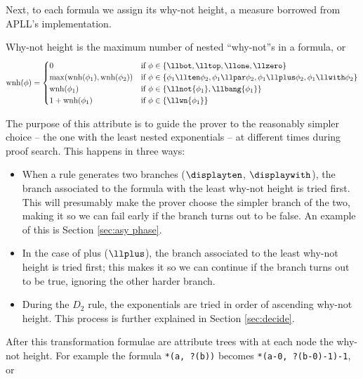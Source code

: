 Next, to each formula we assign its why-not height, a measure borrowed from APLL's implementation.
\begin{define}
	\label{def:why-not height}
	Why-not height is the maximum number of nested ``why-not''s in a formula, or
	$$ \mathrm{wnh}(\phi) = 
	\begin{cases}	
		0 & \text{if }\phi \in \{\llbot, \lltop, \llone, \llzero\} \\
		\max(\mathrm{wnh}(\phi_1), \mathrm{wnh}(\phi_2)) & \text{if } \phi \in \{ \phi_1 \llten \phi_2, \phi_1 \llpar \phi_2, \phi_1 \llplus \phi_2, \phi_1 \llwith \phi_2 \} \\
		\mathrm{wnh}(\phi_1) & \text{if }\phi \in \{ \llnot{\phi_1}, \llbang{\phi_1}\} \\
		1 + \mathrm{wnh}(\phi_1) & \text{if }\phi \in \{ \llwn{\phi_1} \} 
	\end{cases}
	$$
\end{define}
The purpose of this attribute is to guide the prover to the reasonably simpler choice -- the one with the least nested exponentials -- at different times during proof search.
This happens in three ways: 
\begin{itemize}
	\item When a rule generates two branches ($\displayten$, $\displaywith$), the branch associated to the formula with the least why-not height is tried first.
		This will presumably make the prover choose the simpler branch of the two, making it so we can fail early if the branch turns out to be false.
		An example of this is Section \ref{sec:asy phase}.
	\item In the case of plus ($\llplus$), the branch associated to the least why-not height is tried first; this makes it so we can continue if the branch turns out to be true, ignoring the other harder branch.
	\item During the $D_2$ rule, the exponentials are tried in order of ascending why-not height.
		This process is further explained in Section \ref{sec:decide}.
\end{itemize}
After this transformation formulae are attribute trees with at each node the why-not height.
For example the formula \texttt{*(a, ?(b))} becomes \texttt{*(a-0, ?(b-0)-1)-1}, or
\begin{figure}[H]
	\centering
\end{figure}

